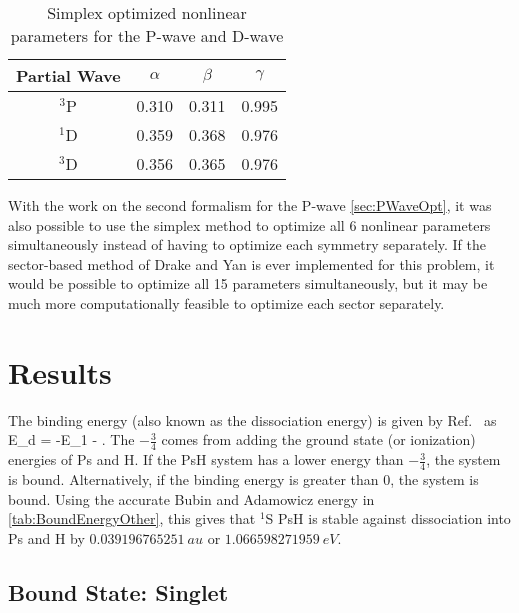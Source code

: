 \documentclass[Dissertation.tex]{subfiles}
\begin{document}
\begin{table}[H]
\small
\centering
\begin{tabular}{c c c c}
\toprule
Partial Wave & $\alpha$ & $\beta$ & $\gamma$ \\
\midrule
$^3$P & 0.310 & 0.311 & 0.995 \\
$^1$D & 0.359 & 0.368 & 0.976 \\
$^3$D & 0.356 & 0.365 & 0.976 \\
\bottomrule
\end{tabular}
\caption{Simplex optimized nonlinear parameters for the P-wave and D-wave}
\label{tab:NonlinearOptimizedPD}
\end{table}

With the work on the second formalism for the P-wave \cref{sec:PWaveOpt}, it was also possible to use the simplex method to optimize all 6 nonlinear parameters simultaneously instead of having to optimize each symmetry separately. If the sector-based method of Drake and Yan \cite{Yan1995} is ever implemented for this problem, it would be possible to optimize all 15 parameters simultaneously, but it may be much more computationally feasible to optimize each sector separately.


\section{Results}
\label{sec:BoundResults}

The binding energy (also known as the dissociation energy) is given by Ref.~\cite{Page1974} as
\beq
\label{eq:DissociationE}
E_d = -E_1 -  .
\eeq
The $-\frac{3}{4}$ comes from adding the ground state (or ionization) energies of Ps and H. If the PsH system has a lower energy than $-\frac{3}{4}$, the system is bound. 
Alternatively, if the binding energy is greater than 0, the system is bound.
Using the accurate Bubin and Adamowicz energy in \cref{tab:BoundEnergyOther}, this gives that $^1$S PsH is stable against dissociation into Ps and H by $\SI{0.039 196 765 251}{au}$ or $\SI{1.066 598 271 959}{eV}$. 

\subsection{Bound State: Singlet}
\label{sec:BoundSinglet}
\end{document}
